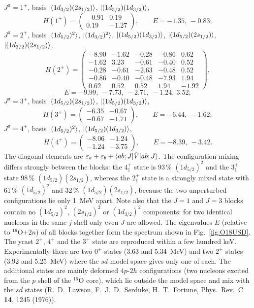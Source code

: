 \documentclass[11pt,a4paper]{article}
\newcommand{\op}[1]{\hat{#1}}
\begin{document}
$J^\pi=1^+$, basis $\ket{(1d_{3/2})(2s_{1/2})}$, $\ket{(1d_{5/2})(1d_{3/2})}$,
\[
H(1^+)=
\begin{pmatrix}
-0.91 & 0.19\\
0.19 & -1.27
\end{pmatrix},
\qquad E=-1.35,\ -0.83;
\]
$J^\pi=2^+$, basis $\ket{(1d_{5/2})^2}$, $\ket{(1d_{3/2})^2}$, $\ket{(1d_{5/2})(1d_{3/2})}$, $\ket{(1d_{5/2})(2s_{1/2})}$, $\ket{(1d_{3/2})(2s_{1/2})}$,
\[
H(2^+)=
\begin{pmatrix}
-8.90 & -1.62 & -0.28 & -0.86 & 0.62\\
-1.62 & 3.23 & -0.61 & -0.40 & 0.52\\
-0.28 & -0.61 & -2.63 & -0.48 & 0.52\\
-0.86 & -0.40 & -0.48 & -7.93 & 1.94\\
0.62 & 0.52 & 0.52 & 1.94 & -1.92
\end{pmatrix},
\]
\[
E=-9.99,\ -7.73,\ -2.71,\ -1.24,\ 3.52;
\]
$J^\pi=3^+$, basis $\ket{(1d_{5/2})(2s_{1/2})}$, $\ket{(1d_{5/2})(1d_{3/2})}$,
\[
H(3^+)=
\begin{pmatrix}
-6.35 & -0.67\\
-0.67 & -1.71
\end{pmatrix},
\qquad E=-6.44,\ -1.62;
\]
$J^\pi=4^+$, basis $\ket{(1d_{5/2})^2}$, $\ket{(1d_{5/2})(1d_{3/2})}$,
\[
H(4^+)=
\begin{pmatrix}
-8.06 & -1.24\\
-1.24 & -3.75
\end{pmatrix},
\qquad E=-8.39,\ -3.42.
\]
The diagonal elements are $\varepsilon_a+\varepsilon_b+\braket{ab;J|\op V|ab;J}$. The configuration mixing differs strongly between the blocks: the $4^+_1$ state is 93\,\% $(1d_{5/2})^2$ and the $3^+_1$ state 98\,\% $(1d_{5/2})(2s_{1/2})$, whereas the $2^+_1$ state is a strongly mixed state with 61\,\% $(1d_{5/2})^2$ and 32\,\% $(1d_{5/2})(2s_{1/2})$, because the two unperturbed configurations lie only 1~MeV apart. Note also that the $J=1$ and $J=3$ blocks contain no $(1d_{5/2})^2$, $(2s_{1/2})^2$ or $(1d_{3/2})^2$ components: for two identical nucleons in the same $j$ shell only even $J$ are allowed.
The eigenvalues $E$ (relative to ${}^{16}$O$+2n$) of all blocks together form the spectrum shown in Fig.~\ref{fig:O18USD}. The yrast $2^+$, $4^+$ and the $3^+$ state are reproduced within a few hundred keV. Experimentally there are two $0^+$ states (3.63 and 5.34~MeV) and two $2^+$ states (3.92 and 5.25~MeV) where the $sd$ model space gives only one of each. The additional states are mainly deformed $4p$-$2h$ configurations (two nucleons excited from the $p$ shell of the ${}^{16}$O core), which lie outside the model space and mix with the $sd$ states (R.~D.~Lawson, F.~J.~D.~Serduke, H.~T.~Fortune, Phys.\ Rev.\ C \textbf{14}, 1245 (1976)).
\end{document}
